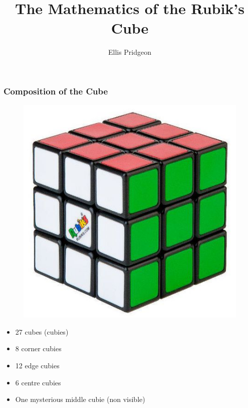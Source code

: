 \documentclass{beamer}
\title[Short title]{The Mathematics of the Rubik's Cube} %
\author{Ellis Pridgeon} %
\institute[University of Bristol] %
{
University of Bristol \\ %
\medskip
\textit{ep15193 - H Level 20CP} %
}
\date{} %
\begin{document}
\begin{frame}
\titlepage %
\end{frame}



\begin{frame}
\frametitle{Composition of the Cube}
\begin{figure}
\includegraphics[scale=.5]{rubiks.jpg}
\end{figure}
\begin{itemize}
\item 27 cubes (cubies)
\item 8 corner cubies
\item 12 edge cubies
\item 6 centre cubies
\item One mysterious middle cubie (non visible)
\end{itemize}
\end{frame}

\end{document}
